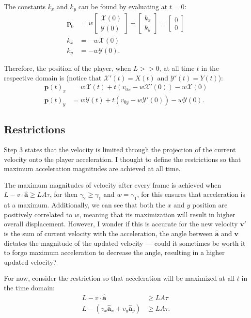 \documentclass[a4paper,11pt]{article}
\newcommand{\tvec}[1]{\boldsymbol{#1}}
\newcommand{\tunit}[1]{\boldsymbol{\hat{#1}}}
\newcommand{\tv}{\tvec{v}}
\newcommand{\tp}{\tvec{p}}
\newcommand{\tpar}[2]{\begin{bmatrix}#1\\#2 \end{bmatrix}}
\newcommand{\tfx}{\mathcal{X}}
\newcommand{\tfy}{\mathcal{Y}}
\begin{document}
The constants $k_x$ and $k_y$ can be found by evaluating at $t=0$:
\begin{align*}
    \tp_0 &= w \tpar{\tfx(0)}{\tfy(0)} + \tpar{k_x}{k_y} = \tpar{0}{0}\\
    k_x &= -w\tfx(0)\\
    k_y &= -w\tfy(0).
\end{align*}

Therefore, the position of the player, when $L >> 0$, at all time $t$ in the respective domain is (notice that $\tfx'(t) = X(t)$ and $\tfy'(t) = Y(t)$):
\begin{align*}
 \tp(t)_x &= w\tfx(t) + t(v_{0x} - w\tfx'(0)) - w\tfx(0)\\
 \tp(t)_y &= w\tfy(t) + t(v_{0y} - w\tfy'(0)) - w\tfy(0).
\end{align*}

\subsection{Restrictions}
Step 3 states that the velocity is limited through the projection of the current velocity onto the player acceleration. I thought to define the restrictions so that maximum acceleration magnitudes are achieved at all time.

The maximum magnitudes of velocity after every frame is achieved when $L- v \cdot \tunit{a} \ge LA\tau$, for then $\gamma_2 \ge \gamma_1$ and $w = \gamma_1$, for this ensures that acceleration is at a maximum. Additionally, we can see that both the $x$ and $y$ position are positively correlated to $w$, meaning that its maximization will result in higher overall displacement. However, I wonder if this is accurate for the new velocity $\tv'$ is the sum of current velocity with the acceleration, the angle between $\tunit{a}$ and $\tv$ dictates the magnitude of the updated velocity --- could it sometimes be worth it to forgo maximum acceleration to decrease the angle, resulting in a higher updated velocity?

For now, consider the restriction so that acceleration will be maximized at all $t$ in the time domain:
\begin{align*}
    L - v \cdot \tunit{a} &\ge LA\tau\\
    L - (v_x \tunit{a}_x + v_y \tunit{a}_y) &\ge LA\tau.
\end{align*}
\end{document}
